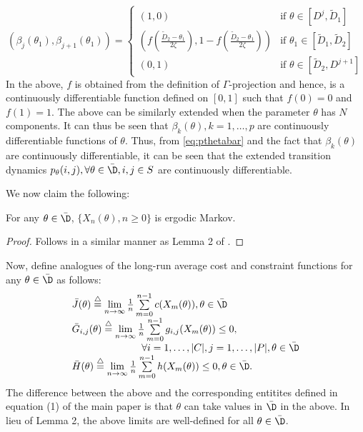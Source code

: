\documentclass[11pt,letterpaper,english]{article}
\begin{document}
\begin{equation}
 (\beta_j(\theta_1),\beta_{j+1}(\theta_1)) =
  \begin{cases}
   (1,0) &  \text{if } \theta \in\left[D^j,\tilde D_1 \right] \\
   (f(\frac{\tilde D_2 - \theta_1}{2\zeta}), 1- f(\frac{\tilde D_2 - \theta_1}{2\zeta})) & \text{if } \theta_1 \in \left[\tilde D_1, \tilde D_2\right]  \\
   (0,1) & \text{if } \theta \in \left[\tilde D_2,D^{j+1}\right]
  \end{cases}
\end{equation}
In the above, $f$ is obtained from the definition of $\Gamma$-projection and hence, is a continuously differentiable function defined on $[0,1]$ such that $f(0)=0$ and $f(1)=1$. The above can be similarly extended when the parameter $\theta$ has $N$ components. It can thus be seen that $\beta_k(\theta), k=1,\ldots,p$ are continuously differentiable functions of $\theta$. Thus, from  \eqref{eq:pthetabar} and the fact that $\beta_k(\theta)$ are continuously differentiable, it can be seen that the extended transition dynamics $p_\theta(i,j), \forall \theta \in \bar\D, i,j \in S$ are continuously differentiable.

We now claim the following:


\begin{lemma}
\label{lemma:markov}
    For any $\theta \in \bar\D$, $\{ X_n(\theta), n\ge 0\}$ is ergodic Markov.
\end{lemma}
\begin{proof}
    Follows in a similar manner as Lemma 2 of \cite{shalabh2011stochastic}.
\end{proof}

Now, define analogues of the long-run average cost and constraint functions for any $\theta \in \bar\D$ as follows:
\begin{equation}
\label{eqn:c-mpbar}
\begin{array}{l}
\bar J(\theta) \stackrel{\triangle}{=} \lim\limits_{n \rightarrow \infty}\frac{1}{n} \sum\limits_{m=0}^{n-1} c(X_m(\theta)), \theta \in \bar\D\\
\bar G_{i,j}(\theta) \stackrel{\triangle}{=} \lim\limits_{n \rightarrow \infty}\frac{1}{n} \sum\limits_{m=0}^{n-1} g_{i,j}(X_m(\theta)) \le 0, \\\qquad\qquad\qquad\quad\forall i=1,\ldots,|C|, j=1,\ldots,|P|, \theta \in \bar\D \\
\bar H(\theta) \stackrel{\triangle}{=} \lim\limits_{n \rightarrow \infty}\frac{1}{n} \sum\limits_{m=0}^{n-1} h(X_m(\theta)) \le 0, \theta \in \bar\D.
\end{array}
\end{equation}
The difference between the above and the corresponding entitites defined in equation (1) of the main paper is that $\theta$ can take values in $\bar\D$ in the above. In lieu of Lemma 2, the above limits are well-defined for all $\theta \in \bar\D$.
\end{document}
